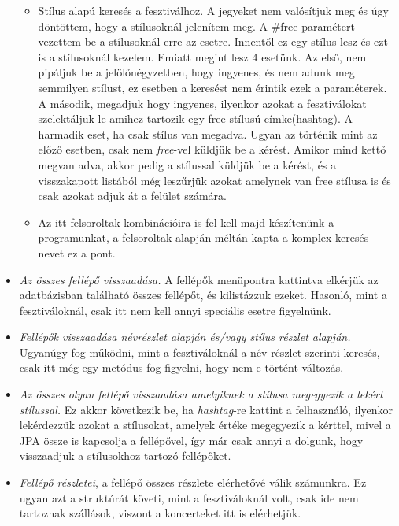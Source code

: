 \begin{itemize}
\begin{itemize}
\item Stílus alapú keresés a fesztiválhoz. A jegyeket nem valósítjuk meg és úgy döntöttem, hogy a stílusoknál jelenítem meg. A \#free paramétert vezettem be a stílusoknál erre az esetre. Innentől ez egy stílus lesz és ezt is a stílusoknál kezelem. Emiatt megint lesz 4 esetünk. Az első, nem pipáljuk be a jelölőnégyzetben, hogy ingyenes, és nem adunk meg semmilyen stílust, ez esetben a keresést nem érintik ezek a paraméterek. A második, megadjuk hogy ingyenes, ilyenkor azokat a fesztiválokat szelektáljuk le amihez tartozik egy free stílusú címke(hashtag). A harmadik eset, ha csak stílus van megadva. Ugyan az történik mint az előző esetben, csak nem \textit{free}-vel küldjük be a kérést. Amikor mind kettő megvan adva, akkor pedig a stílussal küldjük be a kérést, és a visszakapott listából még leszűrjük azokat amelynek van free stílusa is és csak azokat adjuk át a felület számára.
\item Az itt felsoroltak kombinációira is fel kell majd készítenünk a programunkat, a felsoroltak alapján méltán kapta a komplex keresés nevet ez a pont.
\end{itemize}

\item \textit{Az összes fellépő visszaadása.} A fellépők menüpontra kattintva elkérjük az adatbázisban található összes fellépőt, és kilistázzuk ezeket. Hasonló, mint a fesztiváloknál, csak itt nem kell annyi speciális esetre figyelnünk.

\item \textit{Fellépők visszaadása névrészlet alapján és/vagy stílus részlet alapján.} Ugyanúgy fog működni, mint a fesztiváloknál a név részlet szerinti keresés, csak itt még egy metódus fog figyelni, hogy nem-e történt változás. 

\item \textit{Az összes olyan fellépő visszaadása amelyiknek a stílusa megegyezik a lekért stílussal.} Ez akkor következik be, ha \textit{hashtag}-re kattint a felhasználó, ilyenkor lekérdezzük azokat a stílusokat, amelyek értéke megegyezik a kérttel, mivel a JPA össze is kapcsolja a fellépővel, így már csak annyi a dolgunk, hogy visszaadjuk a stílusokhoz tartozó fellépőket.

\item \textit{Fellépő részletei}, a fellépő összes részlete elérhetővé válik számunkra. Ez ugyan azt a struktúrát követi, mint a fesztiváloknál volt, csak ide nem tartoznak szállások, viszont a koncerteket itt is elérhetjük.


\end{itemize}

